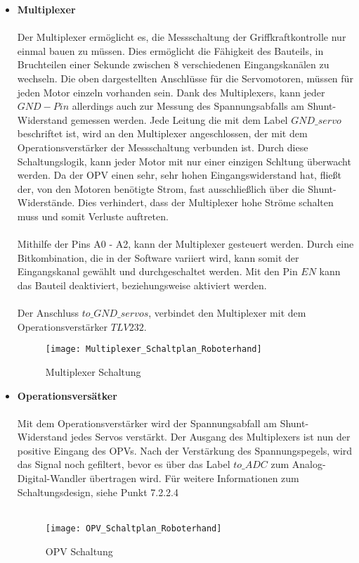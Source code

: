 \documentclass[titlepage,12pt,twoside]{article}
\begin{document}
\begin{itemize}
	\item \textbf{Multiplexer} \\
	\\
	Der Multiplexer ermöglicht es, die Messschaltung der Griffkraftkontrolle nur einmal bauen zu müssen. Dies ermöglicht die Fähigkeit des Bauteils, in Bruchteilen einer Sekunde zwischen 8 verschiedenen Eingangskanälen zu wechseln.
	Die oben dargestellten Anschlüsse für die Servomotoren, müssen für jeden Motor einzeln vorhanden sein. Dank des Multiplexers, kann jeder $GND-Pin$ allerdings auch zur Messung des Spannungsabfalls am Shunt-Widerstand gemessen werden.
	Jede Leitung die mit dem Label $GND\_servo$ beschriftet ist, wird an den Multiplexer angeschlossen, der mit dem Operationsverstärker der Messschaltung verbunden ist. Durch diese Schaltungslogik, kann jeder Motor mit nur einer einzigen
	Schltung überwacht werden. Da der OPV einen sehr, sehr hohen Eingangswiderstand hat, fließt der, von den Motoren benötigte Strom, fast ausschließlich über die Shunt-Widerstände. Dies verhindert, dass der Multiplexer hohe Ströme
	schalten muss und somit Verluste auftreten. \\
	\\
	Mithilfe der Pins A0 - A2, kann der Multiplexer gesteuert werden. Durch eine Bitkombination, die in der Software variiert wird, kann somit der Eingangskanal gewählt und durchgeschaltet werden. Mit den Pin $EN$ kann das Bauteil deaktiviert,
	beziehungsweise aktiviert werden. \\
	\\
	Der Anschluss $to\_GND\_servos$, verbindet den Multiplexer mit dem Operationsverstärker $TLV232$.
	\\
	\begin{figure}[H]
		\begin{center}
			\scalebox{1.0}
			{\texttt{[image: Multiplexer\_Schaltplan\_Roboterhand]}}
			\caption{Multiplexer Schaltung}
			\label{fig:Multiplexer_Schaltplan_Roboterhand}		
			\end{center}
	\end{figure}
	\hfill \break

	\item \textbf{Operationsversätker} \\
	\\
	Mit dem Operationsverstärker wird der Spannungsabfall am Shunt-Widerstand jedes Servos verstärkt. Der Ausgang des Multiplexers ist nun der positive Eingang des OPVs. Nach der Verstärkung des Spannungspegels, wird
	das Signal noch gefiltert, bevor es über das Label $to\_ADC$ zum Analog-Digital-Wandler übertragen wird. Für weitere Informationen zum Schaltungsdesign, siehe Punkt 7.2.2.4 \\
	\\
	\begin{figure}[H]
		\begin{center}
			\scalebox{1.0}
			{\texttt{[image: OPV\_Schaltplan\_Roboterhand]}}
			\caption{OPV Schaltung}
			\label{fig:OPV_Schaltplan_Roboterhand}		
		\end{center}
	\end{figure}
	\hfill \break


\end{itemize}
\end{document}
